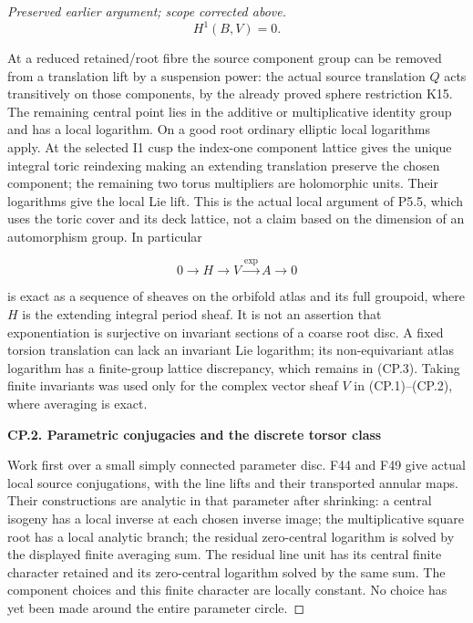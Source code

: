 \begin{proof}[Preserved earlier argument; scope corrected above]
\[
                       H^1(B,V)=0.                         \tag{CP.2}
\]

At a reduced retained/root fibre the source component group can be
removed from a translation lift by a suspension power: the actual
source translation \(Q\) acts transitively on those components, by the
already proved sphere restriction K15. The remaining central point
lies in the additive or multiplicative identity group and has a local
logarithm. On a good root ordinary elliptic local logarithms apply.
At the selected I1 cusp the index-one component lattice gives the
unique integral toric reindexing making an extending translation
preserve the chosen component; the remaining two torus multipliers
are holomorphic units. Their logarithms give the local Lie lift.
This is the actual local argument of P5.5, which uses the toric cover
and its deck lattice, not a claim based on the dimension of an
automorphism group. In particular

\[
 0\longrightarrow H\longrightarrow V\xrightarrow{\exp}A
       \longrightarrow0                                   \tag{CP.3}
\]

is exact as a sequence of sheaves on the orbifold atlas and its
full groupoid, where \(H\) is the extending integral period sheaf. It
is not an assertion that exponentiation is surjective on invariant
sections of a coarse root disc. A fixed torsion translation can lack
an invariant Lie logarithm; its non-equivariant atlas logarithm
has a finite-group lattice discrepancy, which remains in (CP.3).
Taking finite invariants was used only for the complex vector sheaf
\(V\) in (CP.1)--(CP.2), where averaging is exact.

\par

\medskip\noindent\textbf{CP.2. Parametric conjugacies and the discrete torsor class}

\par\nobreak

Work first over a small simply connected parameter disc. F44 and F49
give actual local source conjugations, with the line lifts and their
transported annular maps. Their constructions are analytic in that
parameter after shrinking: a central isogeny has a local inverse at
each chosen inverse image; the multiplicative square root has a local
analytic branch; the residual zero-central logarithm is solved by the
displayed finite averaging sum. The residual line unit has its
central finite character retained and its zero-central logarithm
solved by the same sum. The component choices and this finite
character are locally constant. No choice has yet been made around
the entire parameter circle.


\end{proof}
